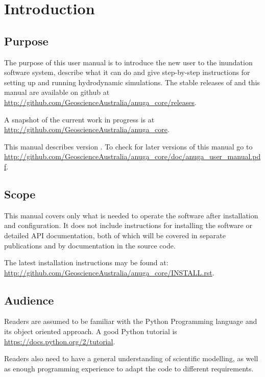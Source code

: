 \documentclass{manual}
\begin{document}

\chapter{Introduction}


\section{Purpose}

The purpose of this user manual is to introduce the new user to the
inundation software system, describe what it can do and give step-by-step
instructions for setting up and running hydrodynamic simulations.
The stable releases of \anuga and this manual are available on github at
\url{http://github.com/GeoscienceAustralia/anuga_core/releases}. 

A snapshot of the current work in progress is at  
\url{http://github.com/GeoscienceAustralia/anuga_core}. 

This manual describes \anuga version \version. To check for later versions of this manual
go to \url{http://github.com/GeoscienceAustralia/anuga_core/doc/anuga_user_manual.pdf}.

\section{Scope}

This manual covers only what is needed to operate the software after
installation and configuration. It does not include instructions
for installing the software or detailed API documentation, both of
which will be covered in separate publications and by documentation
in the source code.

The latest installation instructions may be found at:
\url{http://github.com/GeoscienceAustralia/anuga_core/INSTALL.rst}.

\section{Audience}

Readers are assumed to be familiar with the Python Programming language and
its object oriented approach.
A good Python tutorial is
\url{https://docs.python.org/2/tutorial}.

Readers also need to have a general understanding of scientific modelling,
as well as enough programming experience to adapt the code to different
requirements.
\end{document}
